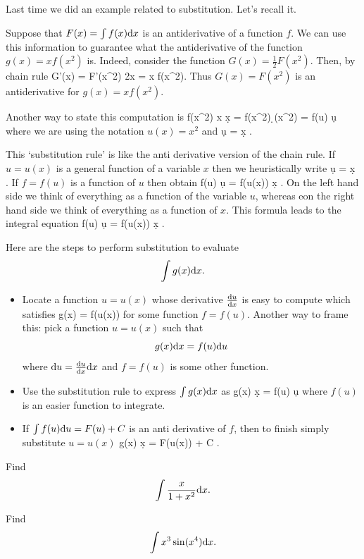 \documentclass[11pt]{amsart}
\begin{document}
\newpage 

Last time we did an example related to substitution. 
Let's recall it. 

Suppose that $F (x) = \int f(x) {\rm d} x$ is an antiderivative of a function $f$. 
We can use this information to guarantee what the antiderivative of the function $g(x) = x f(x^2)$ is.
Indeed, consider the function $G(x) = \frac12 F(x^2)$. 
Then, by chain rule 
\beqn
G'(x) =  F'(x^2) \cdot 2x = x f(x^2).
\eeqn
Thus $G(x)=F(x^2)$ is an antiderivative for $g(x) = x f(x^2)$.  

Another way to state this computation is
\beqn
\int f(x^2) x \d x =  \int f(x^2) \d \left(x^2\right) =  \int f(u) \d u 
\eeqn
where we are using the notation $u (x) = x^2$ and 
\beqn
\d u =  \d x .
\eeqn

This `substitution rule' is like the anti derivative version of the chain rule.
If $u=u(x)$ is a general function of a variable $x$ then we heuristically write
\beqn
\d u =  \d x .
\eeqn
If $f = f(u)$ is a function of $u$ then obtain
\beqn
f(u) \d u = f(u(x))  \d x .
\eeqn
On the left hand side we think of everything as a function of the variable $u$, whereas eon the right hand side we think of everything as a function of $x$. 
This formula leads to the integral equation
\beqn
\int f(u) \d u = \int f(u(x))  \d x .
\eeqn


\newpage


Here are the steps to perform substitution to evaluate 
\[
\int g(x) {\rm d} x.
\]
\begin{itemize}
\item Locate a function $u = u(x)$ whose derivative $\frac{{\rm d} u}{{\rm d} x}$ is easy to compute which satisfies
\beqn
g(x) = f(u(x))  
\eeqn
for some function $f = f(u)$. 
Another way to frame this: pick a function $u=u(x)$ such that
\[
g(x) {\rm d} x = f(u) {\rm d} u 
\]
where ${\rm d} u = \frac{{\rm d} u}{{\rm d} x} {\rm d} x$ and $f = f(u)$ is some other function.
\item 
Use the substitution rule to express $\int g(x) {\rm d} x$ as 
\beqn
\int g(x) \d x = \int f(u) \d u 
\eeqn
where $f(u)$ is an easier function to integrate.
\item 
If $\int f(u) {\rm d} u = F(u) +C$ is an anti derivative of $f$, then to finish simply substitute $u = u(x)$
\beqn
\int g(x) \d x = F(u(x)) + C .
\eeqn
\end{itemize} 

\vspace{2cm}

\begin{eg} 
Find \[\int \frac{x}{1 + x^2} {\rm d} x.\]
\end{eg} 

\begin{eg} 
Find \[\int x^3 \sin(x^4) {\rm d} x .\]
\end{eg} 
\end{document}
